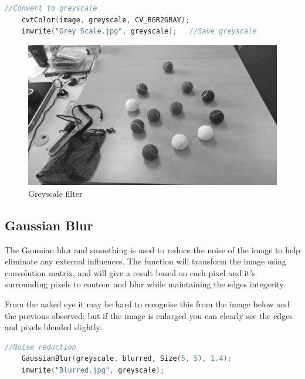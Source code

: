 \documentclass[a4paper, 10pt]{article}
\begin{document}
\begin{lstlisting}[language = C++]
	//Convert to greyscale
	cvtColor(image, greyscale, CV_BGR2GRAY);
	imwrite("Grey Scale.jpg", greyscale);	//Save greyscale
\end{lstlisting} 

\begin{figure}[H]
  \includegraphics[width=\linewidth]{images/GreyScale}
  \caption{Greyscale filter}
  \label{fig:Greyscale filter}
\end{figure}

\clearpage
\subsection{Gaussian Blur}

The Gaussian blur and smoothing is used to reduce the noise of the image to help eliminate any external influences. The function will transform the image using convolution matrix, and will give a result based on each pixel and it's surrounding pixels to contour and blur while maintaining the edges integerity.

From the naked eye it may be hard to recognise this from the image below and the previous observed; but if the image is enlarged you can clearly see the edges and pixels blended slightly.

\begin{lstlisting}[language = C++]
	//Noise reduction
	GaussianBlur(greyscale, blurred, Size(5, 5), 1.4);
	imwrite("Blurred.jpg", greyscale);		
\end{lstlisting}
\end{document}
